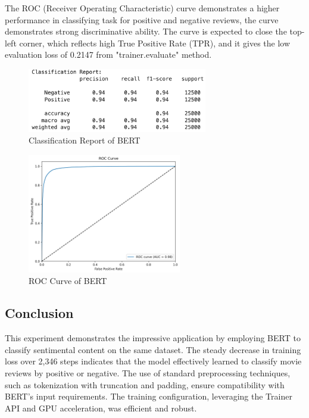 The ROC (Receiver Operating Characteristic) curve demonstrates a higher performance in classifying task for positive and negative reviews, the curve demonstrates strong discriminative ability. The curve is expected to close the top-left corner, which reflects high True Positive Rate (TPR), and it gives the low evaluation loss of 0.2147 from "trainer.evaluate" method. 

\begin{figure}[ht]
    \centering
    \includegraphics[width=0.7\textwidth]{pics/bert_eval_report.png}
    \caption{Classification Report of BERT}
\end{figure}

\begin{figure}[ht]
    \centering
    \includegraphics[width=0.6\textwidth]{pics/bert_roc_curve.png}
    \caption{ROC Curve of BERT}
\end{figure}

\subsection{Conclusion}

This experiment demonstrates the impressive application by employing BERT to classify sentimental content on the same dataset. The steady decrease in training loss over 2,346 steps indicates that the model effectively learned to classify movie reviews by positive or negative. The use of standard preprocessing techniques, such as tokenization with truncation and padding, ensure compatibility with BERT's input requirements. The training configuration, leveraging the Trainer API and GPU acceleration, was efficient and robust.